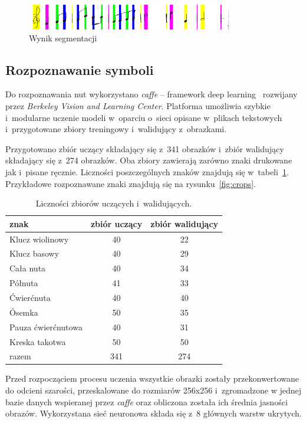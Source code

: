 \documentclass[a4paper,11pt]{article}
\begin{document}
\begin{figure}
\centering
\includegraphics[width=0.8\textwidth]{argb.jpg}
\caption{Wynik segmentacji}
\label{fig:argb}
\end{figure}


\subsection{Rozpoznawanie symboli}

Do rozpoznawania nut wykorzystano \emph{caffe} -- framework deep learning~\cite{jia2014caffe} rozwijany przez \emph{Berkeley Vision and Learning Center}. Platforma umożliwia szybkie i~modularne uczenie modeli w~oparciu o~sieci opisane w~plikach tekstowych i~przygotowane zbiory treningowy i~walidujący z~obrazkami.

Przygotowano zbiór uczący składający się z~341 obrazków i~zbiór walidujący składający się z~274 obrazków. Oba zbiory zawierają zarówno znaki drukowane jak i~pisane ręcznie. Liczności poszczególnych znaków znajdują się w~tabeli~\ref{tab:train_val}. Przykładowe rozpoznawane znaki znajdują się na rysunku~\ref{fig:crops}.

\begin{table}
\centering
\begin{tabular}{l|c|c}
znak & zbiór uczący & zbiór walidujący \\ \hline
Klucz wiolinowy & 40 & 22 \\
Klucz basowy & 40 & 29 \\
Cała nuta & 40 & 34 \\
Półnuta & 41 & 33 \\
Ćwierćnuta & 40 & 40 \\
Ósemka & 50 & 35 \\
Pauza ćwierćnutowa & 40 & 31 \\
Kreska takotwa & 50 & 50 \\ \hline
razem & 341 & 274 \\
\end{tabular}
\caption{Liczności zbiorów uczących i~walidujących.}
\label{tab:train_val}
\end{table}

Przed rozpocząciem procesu uczenia wszystkie obrazki zostały przekonwertowane do odcieni szarości, przeskalowane do rozmiarów 256x256 i~zgromadzone w jednej bazie danych wspieranej przez \emph{caffe} oraz obliczona została ich średnia jasności obrazów. Wykorzystana sieć neuronowa składa się z~8 głównych warstw ukrytych.
\end{document}
